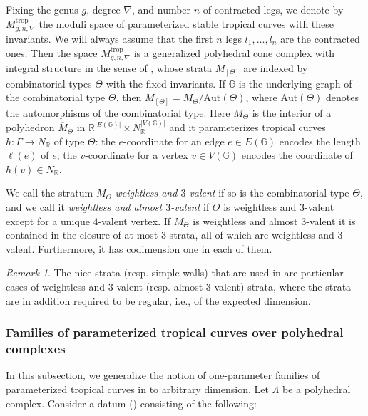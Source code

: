 \documentclass[11pt,reqno]{amsart}
\numberwithin{equation}{section}
\theoremstyle{definition}
\newcommand{\trop}{\mathrm{trop}}
\newcommand{\RR}{{\mathbb R}}
\newcommand{\GG}{{\mathbb G}}
\def\:{\colon}
\theoremstyle{remark}
\newtheorem{rem}[thm]{Remark}
\begin{document}
Fixing the genus $g$, degree $\nabla$, and number $n$ of contracted legs, we denote by $M_{g,n, \nabla}^{\trop}$ the moduli space of parameterized stable tropical curves with these invariants. We will always assume that the first $n$ legs $l_1,\dotsc, l_n$ are the contracted ones.
Then the space $M_{g,n, \nabla}^{\trop}$ is a generalized polyhedral cone complex with integral structure in the sense of \cite{ACP15}, whose strata $M_{[\Theta]}$ are indexed by combinatorial types $\Theta$ with the fixed invariants. If $\GG$ is the underlying graph of the combinatorial type $\Theta$, then $M_{[\Theta]} = M_{\Theta}/\mathrm{Aut}(\Theta)$, where $\mathrm{Aut}(\Theta)$ denotes the automorphisms of the combinatorial type. Here $M_{\Theta}$ is the interior of a polyhedron  $\overline M_\Theta$ in $\RR^{|E(\GG)|} \times N_\RR^{|V(\GG)|}$ and it parameterizes tropical curves $h\: \Gamma \to N_{\RR}$ of type $\Theta$: the $e$-coordinate for an edge $e \in E(\GG)$ encodes the length $\ell(e)$ of $e$; the $v$-coordinate for a vertex $v \in V(\GG)$ encodes the coordinate of $h(v) \in N_\RR$.


We call the stratum $M_\Theta$ {\em weightless and $3$-valent} if so is the combinatorial type $\Theta$, and we call it {\em weightless and almost $3$-valent} if $\Theta$ is weightless and $3$-valent except for a unique $4$-valent vertex. If $M_\Theta$ is weightless and almost $3$-valent it is contained in the closure of at most $3$ strata, all of which are weightless and $3$-valent. Furthermore, it has codimension one in each of them. 

\begin{rem}
    The nice strata (resp. simple walls) that are used in \cite{CHT23} are particular cases of weightless and $3$-valent (resp. almost $3$-valent) strata, where the strata are in addition required to be regular, i.e., of the expected dimension. 
\end{rem}


\subsubsection{Families of parameterized tropical curves over polyhedral complexes} \label{subsubsec:family of parameterized tropical curves}
In this subsection, we generalize the notion of one-parameter families of parameterized tropical curves in \cite[\S 3.1.3]{CHT23} to arbitrary dimension. 
Let $\Lambda$ be a polyhedral complex. Consider a datum (\dag) consisting of the following:
\end{document}
